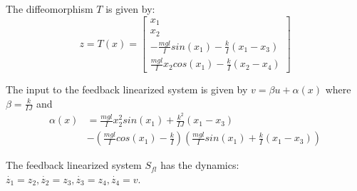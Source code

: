 The diffeomorphism $T$ is given by:
\begin{equation}
z = T(x) = \begin{bmatrix} x_1 \\ x_2 \\ -\frac{mgl}{I}sin(x_1) -\frac{k}{I}(x_1-x_3) \\ \frac{mgl}{I}x_2cos(x_1) - \frac{k}{I}(x_2-x_4)   \end{bmatrix}
\end{equation}

The input to the feedback linearized system is given by $v=\beta u+ \alpha(x)$ where $\beta=\frac{k}{IJ} $ and 
\begin{subequations}
\label{eq:fblin_inp}
\begin{align}
\alpha(x)&=\frac{mgl}{I}x_2^2sin(x_1) + \frac{k^2}{IJ}(x_1-x_3) \nonumber \\
&- (\frac{mgl}{I}cos(x_1)-\frac{k}{I})(\frac{mgl}{I}sin(x_1)+\frac{k}{I}(x_1-x_3))
\end{align}
\end{subequations}

The feedback linearized system $S_{fl}$ has the dynamics:
$\dot{z_1} = z_2, \dot{z_2} = z_3, \dot{z_3} = z_4, \dot{z_4} = v$.


